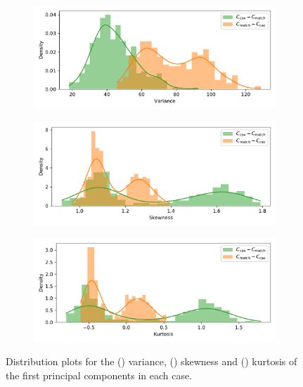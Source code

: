 \documentclass[smallextended]{svjour3}
\newcommand{\imgwidth}{.85\textwidth}
\begin{document}
\begin{figure}
    \centering
    \begin{subfigure}{\imgwidth}
        \includegraphics[width=\linewidth]{Fig10a.pdf}%
        \caption{}\label{fig:edo_variance}
    \end{subfigure}

    \begin{subfigure}{\imgwidth}
        \includegraphics[width=\linewidth]{Fig10b.pdf}%
    \caption{}\label{fig:edo_skewness}
    \end{subfigure}
    
    \begin{subfigure}{\imgwidth}
        \includegraphics[width=\linewidth]{Fig10c.pdf}%
        \caption{}\label{fig:edo_kurtosis}
    \end{subfigure}
    \caption{Distribution plots for the () variance,
        () skewness and ()
        kurtosis of the first principal components in each
        case.}\label{fig:edo_moments}
\end{figure}
\end{document}
